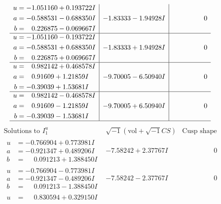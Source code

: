 \documentclass[1p]{elsarticle_modified}
\theoremstyle{definition}
\newcommand{\I}{\sqrt{-1}}
\begin{document}
$$\begin{array}{c|c|c}
\begin{aligned}
u &= -1.051160 + 0.193722 I \\
a &= -0.588531 - 0.688350 I \\
b &= \phantom{-}0.226875 - 0.069667 I\end{aligned}
 & -1.83333 - 1.94928 I & \phantom{-0.000000 } 0 \\ \hline\begin{aligned}
u &= -1.051160 - 0.193722 I \\
a &= -0.588531 + 0.688350 I \\
b &= \phantom{-}0.226875 + 0.069667 I\end{aligned}
 & -1.83333 + 1.94928 I & \phantom{-0.000000 } 0 \\ \hline\begin{aligned}
u &= \phantom{-}0.982142 + 0.468578 I \\
a &= \phantom{-}0.91609 + 1.21859 I \\
b &= -0.39039 + 1.53681 I\end{aligned}
 & -9.70005 - 6.50940 I & \phantom{-0.000000 } 0 \\ \hline\begin{aligned}
u &= \phantom{-}0.982142 - 0.468578 I \\
a &= \phantom{-}0.91609 - 1.21859 I \\
b &= -0.39039 - 1.53681 I\end{aligned}
 & -9.70005 + 6.50940 I & \phantom{-0.000000 } 0\\
 \hline 
 \end{array}$$\newpage$$\begin{array}{c|c|c}  
\text{Solutions to }I^u_{1}& \I (\text{vol} + \sqrt{-1}CS) & \text{Cusp shape}\\
 \hline 
\begin{aligned}
u &= -0.766904 + 0.773981 I \\
a &= -0.921347 + 0.489206 I \\
b &= \phantom{-}0.091213 + 1.388450 I\end{aligned}
 & -7.58242 + 2.37767 I & \phantom{-0.000000 } 0 \\ \hline\begin{aligned}
u &= -0.766904 - 0.773981 I \\
a &= -0.921347 - 0.489206 I \\
b &= \phantom{-}0.091213 - 1.388450 I\end{aligned}
 & -7.58242 - 2.37767 I & \phantom{-0.000000 } 0 \\ \hline\begin{aligned}
u &= \phantom{-}0.830594 + 0.329150 I \\

\end{aligned}
\end{array}$$
\end{document}
